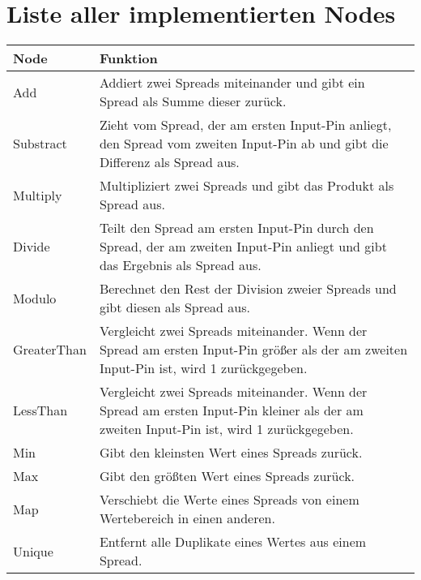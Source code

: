 \documentclass[a4paper, 
               12pt,
               DIV=calc,
               version=first,
               pdftex,
               headsepline,
               footsepline,
               bibliography=totocnumbered,
               listof=numbered]{scrreprt}
\begin{document}
\section{Liste aller implementierten Nodes}
\label{sec:alleNodes}
\centering
\begin{tabular}{|l|p{10cm}|}
\hline
\textbf{Node} & \textbf{Funktion}\\
\hline
Add & Addiert zwei Spreads miteinander und gibt ein Spread als Summe dieser zurück.\\
\hline
Substract & Zieht vom Spread, der am ersten Input-Pin anliegt, den Spread vom zweiten Input-Pin ab und gibt die Differenz als Spread aus.\\
\hline
Multiply & Multipliziert zwei Spreads und gibt das Produkt als Spread aus.\\
\hline
Divide & Teilt den Spread am ersten Input-Pin durch den Spread, der am zweiten Input-Pin anliegt und gibt das Ergebnis als Spread aus.\\
\hline
Modulo & Berechnet den Rest der Division zweier Spreads und gibt diesen als Spread aus.\\
\hline
GreaterThan & Vergleicht zwei Spreads miteinander. Wenn der Spread am ersten Input-Pin größer
als der am zweiten Input-Pin ist, wird 1 zurückgegeben.\\
\hline
LessThan & Vergleicht zwei Spreads miteinander. Wenn der Spread am ersten Input-Pin kleiner
als der am zweiten Input-Pin ist, wird 1 zurückgegeben.\\
\hline
Min & Gibt den kleinsten Wert eines Spreads zurück.\\
\hline
Max & Gibt den größten Wert eines Spreads zurück.\\
\hline
Map & Verschiebt die Werte eines Spreads von einem Wertebereich in einen anderen.\\
\hline
Unique & Entfernt alle Duplikate eines Wertes aus einem Spread.\\
\hline
\end{tabular}
\end{document}
